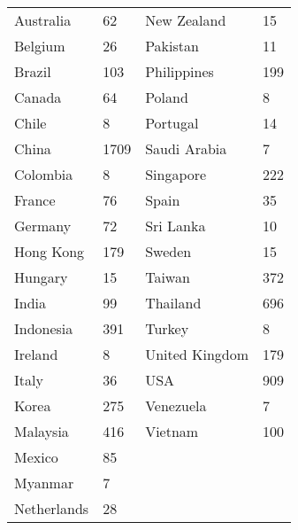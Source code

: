 \begin{tabular}{llll}
  \hline
  \hline
Australia &   62 & New Zealand &  15 \\ 
  Belgium &   26 & Pakistan &  11 \\ 
  Brazil &  103 & Philippines & 199 \\ 
  Canada &   64 & Poland &   8 \\ 
  Chile &    8 & Portugal &  14 \\ 
  China & 1709 & Saudi Arabia &   7 \\ 
  Colombia &    8 & Singapore & 222 \\ 
  France &   76 & Spain &  35 \\ 
  Germany &   72 & Sri Lanka &  10 \\ 
  Hong Kong &  179 & Sweden &  15 \\ 
  Hungary &   15 & Taiwan & 372 \\ 
  India &   99 & Thailand & 696 \\ 
  Indonesia &  391 & Turkey &   8 \\ 
  Ireland &    8 & United Kingdom & 179 \\ 
  Italy &   36 & USA & 909 \\ 
  Korea &  275 & Venezuela &   7 \\ 
  Malaysia &  416 & Vietnam & 100 \\ 
  Mexico &   85 &  &  \\ 
  Myanmar &    7 &  &  \\ 
  Netherlands &   28 &  &  \\ 
   \hline
\end{tabular}
